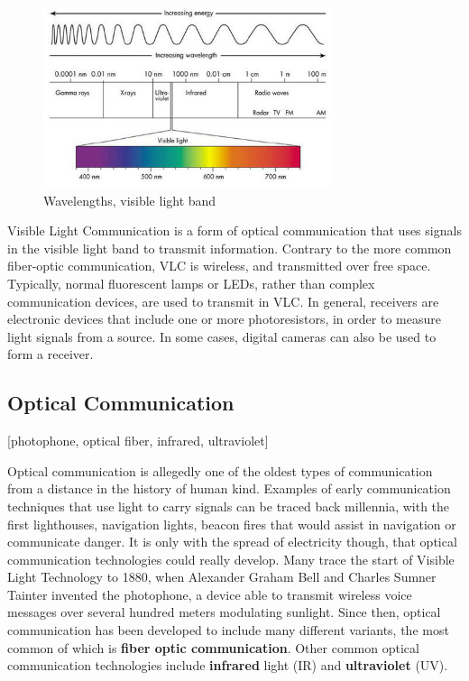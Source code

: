 
\begin{figure}[hbt]
	\centering
  \includegraphics[height=200px]{img/wavelengths}
  \caption{Wavelengths, visible light band}
  \label{fig:wavelength}
\end{figure}

Visible Light Communication is a form of optical communication that uses signals in the visible light band to transmit information.
Contrary to the more common fiber-optic communication, VLC is wireless, and transmitted over free space.
Typically, normal fluorescent lamps or LEDs, rather than complex communication devices,  are used to transmit in VLC.
In general, receivers are electronic devices that include one or more photoresistors, in order to measure light signals from a source.
In some cases, digital cameras can also be used to form a receiver. 


\subsection{Optical Communication}
[photophone, optical fiber, infrared, ultraviolet]

Optical communication is allegedly one of the oldest types of communication from a distance in the history of human kind.
Examples of early communication techniques that use light to carry signals can be traced back millennia, with the first lighthouses, navigation lights, beacon fires that would assist in navigation or communicate danger.
It is only with the spread of electricity though, that optical communication technologies could really develop.
Many trace the start of Visible Light Technology to 1880, when Alexander Graham Bell and Charles Sumner Tainter invented the photophone, a device able to transmit wireless voice messages over several hundred meters modulating sunlight. 
Since then, optical communication has been developed to include many different variants, the most common  of which is \textbf{fiber optic communication}. 
Other common optical communication technologies include \textbf{infrared} light (IR) and \textbf{ultraviolet} (UV). 

